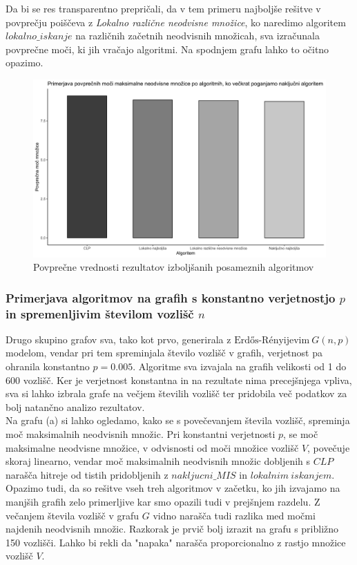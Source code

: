 \documentclass[a4paper, 12pt]{article}
\begin{document}
\newpage
\noindent Da bi se res transparentno prepričali, da v tem primeru najboljše rešitve v povprečju poiščeva z \textit{Lokalno različne neodvisne množice}, ko naredimo algoritem $lokalno\_iskanje$
na različnih začetnih neodvisnih množicah, sva izračunala povprečne moči, ki jih vračajo algoritmi. Na spodnjem grafu lahko to očitno opazimo.
\begin{figure}[h!]
	\begin{center}
		\includegraphics[scale=0.11]{R_koda/pon-povpmoc-maxi.png}
		\caption{Povprečne vrednosti rezultatov izboljšanih posameznih algoritmov}
	\end{center}
\end{figure}


\subsubsection{Primerjava algoritmov na grafih s konstantno verjetnostjo $p$ in spremenljivim številom vozlišč $n$}

Drugo skupino grafov sva, tako kot prvo, generirala z $\text{Erdős-Rényijevim}\ G(n, p)$ modelom, vendar pri tem spreminjala število vozlišč v grafih, verjetnost pa ohranila konstantno $p=0.005$.
Algoritme sva izvajala na grafih velikosti od 1 do 600 vozlišč. Ker je verjetnost konstantna in na rezultate nima precejšnjega vpliva, sva si lahko izbrala grafe na večjem številih vozlišč ter pridobila več podatkov za bolj natančno analizo rezultatov.\\

\noindent Na grafu (a) si lahko ogledamo, kako se s povečevanjem števila vozlišč, spreminja moč maksimalnih neodvisnih množic. Pri konstantni verjetnosti $p$, se moč maksimalne neodvisne množice, v odvisnosti od 
moči množice vozlišč $V$, povečuje skoraj linearno, vendar moč maksimalnih neodvisnih množic dobljenih s $CLP$ narašča hitreje od tistih pridobljenih z $nakljucni\_MIS$ in
$lokalnim\ iskanjem$. Opazimo tudi, da so rešitve vseh treh algoritmov v začetku, ko jih izvajamo na manjših grafih zelo primerljive kar smo opazili tudi v prejšnjem razdelu. Z večanjem 
števila vozlišč v grafu $G$ vidno narašča tudi razlika med močmi najdenih neodvisnih množic. Razkorak je prvič bolj izrazit na grafu s približno 150 vozlišči. Lahko bi rekli da "napaka" narašča proporcionalno z rastjo množice vozlišč $V$.\\
\end{document}

